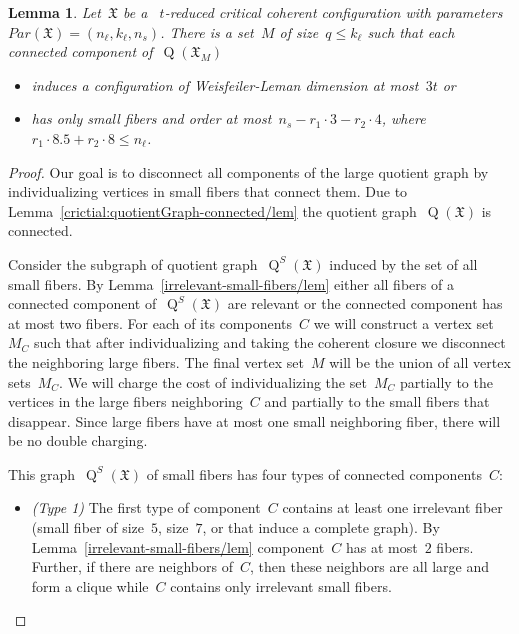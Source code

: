 \documentclass[english,a4paper]{article}
\theoremstyle{plain}
\newtheorem{lemma}      [theorem]{Lemma}
\theoremstyle{definition}
\newcommand{\coherentConfig}{\ensuremath{\mathfrak{X}}}
\DeclareMathOperator*{\Quotient}{Q}
\newcommand{\quotientGraph}[1]{\ensuremath{\Quotient(#1)}}
\newcommand{\quotientGraphSmall}[1]{\ensuremath{\Quotient^S(#1)}}
\begin{document}
\begin{lemma}
\label{lem:the:newest:global-argument}
    Let~$\coherentConfig$ be a ~$t$-reduced critical coherent configuration with parameters~$Par(\coherentConfig)=(n_\ell, k_\ell,n_s)$.
    There is a set~$M$ of size~$q\leq k_\ell$ such that each connected component of~$\quotientGraph{\coherentConfig_M}$
    \begin{itemize}
        \item induces a configuration of Weisfeiler-Leman dimension at most~$3t$ or
        \item has only small fibers and order at most~$n_s - r_1 \cdot 3-r_2\cdot 4$, where~$r_1\cdot 8.5 +r_2\cdot 8\leq n_\ell$.
    \end{itemize}
\end{lemma}
\begin{proof}
    Our goal is to disconnect all components of the large quotient graph by individualizing vertices in small fibers that connect them.
    Due to Lemma~\ref{crictial:quotientGraph-connected/lem} the quotient graph~$\quotientGraph{\coherentConfig}$ is connected.

    Consider the subgraph of quotient graph~$\quotientGraphSmall{\coherentConfig}$ induced by the set of all small fibers.
    By Lemma~\ref{irrelevant-small-fibers/lem} either all fibers of a connected component of~$\quotientGraphSmall{\coherentConfig}$ are relevant or the connected component has at most two fibers.
    For each of its components~$C$ we will construct a vertex set~$M_C$ such that after individualizing and taking the coherent closure we disconnect the neighboring large fibers. The final vertex set~$M$ will be the union of all vertex sets~$M_C$. We will charge the cost of individualizing the set~$M_C$ partially to the vertices in the large fibers neighboring~$C$ and partially to the small fibers that disappear.
    Since large fibers have at most one small neighboring fiber, there will be no double charging.

    This graph~$\quotientGraphSmall{\coherentConfig}$ of small fibers has four types of connected components~$C$:
    \begin{itemize}
        \item \emph{(Type 1)}
        The first type of component~$C$ contains at least one irrelevant fiber (small fiber of size~$5$, size~$7$, or that induce a complete graph).
        By Lemma~\ref{irrelevant-small-fibers/lem} component~$C$ has at most~$2$ fibers.
        Further, if there are neighbors of~$C$, then these neighbors are all large and form a clique while~$C$ contains only irrelevant small fibers.


\end{itemize}
\end{proof}
\end{document}
